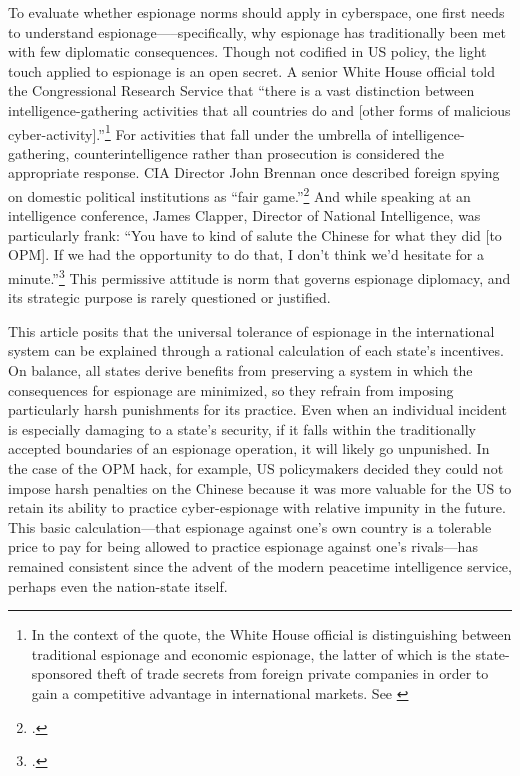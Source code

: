 \documentclass[14pt]{extarticle}
\begin{document}
To evaluate whether espionage norms should apply in cyberspace, one first needs to understand espionage—--specifically, why espionage has traditionally been met with few diplomatic consequences. Though not codified in US policy, the light touch applied to espionage is an open secret. A senior White House official told the Congressional Research Service that \enquote{there is a vast distinction between intelligence-gathering activities that all countries do and [other forms of malicious cyber-activity].}\footnote{In the context of the quote, the White House official is distinguishing between traditional espionage and economic espionage, the latter of which is the state-sponsored theft of trade secrets from foreign private companies in order to gain a competitive advantage in international markets. See \cite{finklea_cyber_2015}} For activities that fall under the umbrella of intelligence-gathering, counterintelligence rather than prosecution is considered the appropriate response. CIA Director John Brennan once described foreign spying on domestic political institutions as \enquote{fair game.}\footcite{sanger_u.s._2016} And while speaking at an intelligence conference, James Clapper, Director of National Intelligence, was particularly frank: \enquote{You have to kind of salute the Chinese for what they did [to OPM]. If we had the opportunity to do that, I don’t think we’d hesitate for a minute.}\footcite{pepitone_clapper_2015} This permissive attitude is norm that governs espionage diplomacy, and its strategic purpose is rarely questioned or justified.


This article posits that the universal tolerance of espionage in the international system can be explained through a rational calculation of each state's incentives. On balance, all states derive benefits from preserving a system in which the consequences for espionage are minimized, so they refrain from imposing particularly harsh punishments for its practice. Even when an individual incident is especially damaging to a state's security, if it falls within the traditionally accepted boundaries of an espionage operation, it will likely go unpunished. In the case of the OPM hack, for example, US policymakers decided they could not impose harsh penalties on the Chinese because it was more valuable for the US to retain its ability to practice cyber-espionage with relative impunity in the future. This basic calculation---that espionage against one's own country is a tolerable price to pay for being allowed to practice espionage against one's rivals---has remained consistent since the advent of the modern peacetime intelligence service, perhaps even the nation-state itself.
\end{document}
